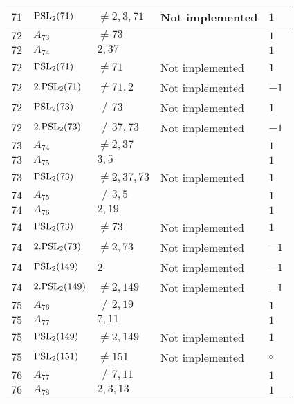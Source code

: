\documentclass[a4paper, 11pt]{article}
\begin{document}
\begin{longtable}{lllll}
        $ 71 $ & $ {\rm PSL}_{2}(71) $ & $ \neq 2, 3, 71 $ & Not implemented & $ 1  $ \\ \hline
        $ 72 $ & $ A_{73} $ & $ \neq 73 $ & $ ~ $ & $ 1  $ \\ \hline
        $ 72 $ & $ A_{74} $ & $ 2, 37 $ & $ ~ $ & $ 1  $ \\ \hline
        $ 72 $ & $ {\rm PSL}_{2}(71) $ & $ \neq 71 $ & Not implemented & $ 1  $ \\ \hline
        $ 72 $ & $ 2.{\rm PSL}_{2}(71) $ & $ \neq 71, 2 $ & Not implemented & $ -1  $ \\ \hline
        $ 72 $ & $ {\rm PSL}_{2}(73) $ & $ \neq 73 $ & Not implemented & $ 1  $ \\ \hline
        $ 72 $ & $ 2.{\rm PSL}_{2}(73) $ & $ \neq 37, 73 $ & Not implemented & $ -1  $ \\ \hline
        $ 73 $ & $ A_{74} $ & $ \neq 2, 37 $ & $ ~ $ & $ 1  $ \\ \hline
        $ 73 $ & $ A_{75} $ & $ 3, 5 $ & $ ~ $ & $ 1  $ \\ \hline
        $ 73 $ & $ {\rm PSL}_{2}(73) $ & $ \neq 2, 37, 73 $ & Not implemented & $ 1  $ \\ \hline
        $ 74 $ & $ A_{75} $ & $ \neq 3, 5 $ & $ ~ $ & $ 1  $ \\ \hline
        $ 74 $ & $ A_{76} $ & $ 2, 19 $ & $ ~ $ & $ 1  $ \\ \hline
        $ 74 $ & $ {\rm PSL}_{2}(73) $ & $ \neq 73 $ & Not implemented & $ 1  $ \\ \hline
        $ 74 $ & $ 2.{\rm PSL}_{2}(73) $ & $ \neq 2, 73 $ & Not implemented & $ -1  $ \\ \hline
        $ 74 $ & $ {\rm PSL}_{2}(149) $ & $ 2 $ & Not implemented & $ -1  $ \\ \hline
        $ 74 $ & $ 2.{\rm PSL}_{2}(149) $ & $ \neq 2, 149 $ & Not implemented & $ -1  $ \\ \hline
        $ 75 $ & $ A_{76} $ & $ \neq 2, 19 $ & $ ~ $ & $ 1  $ \\ \hline
        $ 75 $ & $ A_{77} $ & $ 7, 11 $ & $ ~ $ & $ 1  $ \\ \hline
        $ 75 $ & $ {\rm PSL}_{2}(149) $ & $ \neq 2, 149 $ & Not implemented & $ 1  $ \\ \hline
        $ 75 $ & $ {\rm PSL}_{2}(151) $ & $ \neq 151 $ & Not implemented & $\circ$ \\ \hline
        $ 76 $ & $ A_{77} $ & $ \neq 7, 11 $ & $ ~ $ & $ 1  $ \\ \hline
        $ 76 $ & $ A_{78} $ & $ 2, 3, 13 $ & $ ~ $ & $ 1  $ \\ \hline

\end{longtable}
\end{document}

